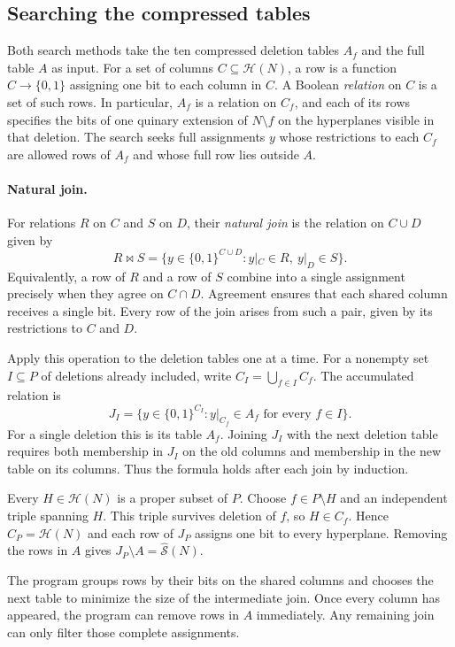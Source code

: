 \documentclass[11pt,a4paper]{article}
\theoremstyle{definition}
\newcommand{\HH}{\mathcal H}
\begin{document}
\subsection{Searching the compressed tables}\label{sec:sat}

Both search methods take the ten compressed deletion tables $A_f$
and the full table $A$ as input. For a set of columns
$C\subseteq\HH(N)$, a row is a function $C\to\{0,1\}$ assigning
one bit to each column in $C$. A Boolean \emph{relation} on $C$
is a set of such rows. In particular, $A_f$ is a relation on $C_f$,
and each of its rows specifies the bits of one quinary extension
of $N\setminus f$ on the hyperplanes visible in that deletion.
The search seeks full assignments $y$ whose restrictions to
each $C_f$ are allowed rows of $A_f$ and whose full row lies
outside $A$.

\paragraph{Natural join.}
For relations $R$ on $C$ and $S$ on $D$, their \emph{natural
join} is the relation on $C\cup D$ given by
\[
 R\Join S
 =
 \{y\in\{0,1\}^{C\cup D} : y|_C\in R,\ y|_D\in S\}.
\]
Equivalently, a row of $R$ and a row of $S$ combine into a
single assignment precisely when they agree on $C\cap D$.
Agreement ensures that each shared column receives a single bit.
Every row of the join arises from such a pair, given by its
restrictions to $C$ and $D$.

Apply this operation to the deletion tables one at a time.
For a nonempty set $I\subseteq P$ of deletions already included,
write $C_I=\bigcup_{f\in I}C_f$. The accumulated relation is
\[
 J_I=\{y\in\{0,1\}^{C_I}:y|_{C_f}\in A_f
                                  \text{ for every }f\in I\}.
\]
For a single deletion this is its table $A_f$. Joining $J_I$
with the next deletion table requires both membership in $J_I$
on the old columns and membership in the new table on its
columns. Thus the formula holds after each join by induction.

Every $H\in\HH(N)$ is a proper subset of $P$. Choose $f\in
P\setminus H$ and an independent triple spanning $H$. This
triple survives deletion of $f$, so $H\in C_f$. Hence
$C_P=\HH(N)$ and each row of $J_P$ assigns one bit to every
hyperplane. Removing the rows in $A$ gives
$J_P\setminus A=\widehat{\mathcal S}(N)$.

The program groups rows by their bits on the shared columns and
chooses the next table to minimize the size of the intermediate
join. Once every column has appeared, the program can remove rows
in $A$ immediately. Any remaining join can only filter those
complete assignments.
\end{document}
